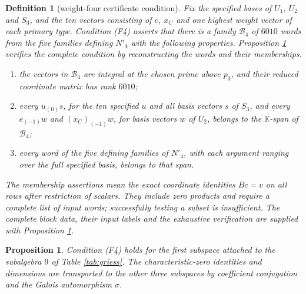 \documentclass[leqno]{article}
\newcommand{\K}{\ensuremath{\mathbb{K}}}
\newtheorem{defi}[thm]{Definition}
\newtheorem{prop}[thm]{Proposition}
\numberwithin{equation}{section}
\begin{document}
\begin{defi}[weight-four certificate condition]
\label{assump:weight-four}
Fix the specified bases of $U_1$, $U_2$ and $S_3$, and the ten vectors consisting of $e$, $x_C$ and one highest weight vector of each primary type. Condition \textup{(F4)} asserts that there is a family $\mathcal B_4$ of $6010$ words from the five families defining $N'_4$ with the following properties. Proposition \ref{prop:weight-four-certificate} verifies the complete condition by reconstructing the words and their memberships.
\begin{enumerate}
\item the vectors in $\mathcal B_4$ are integral at the chosen prime above $p_3$, and their reduced coordinate matrix has rank $6010$;
\item every $u_{(0)}s$, for the ten specified $u$ and all basis vectors $s$ of $S_3$, and every $e_{(-1)}w$ and $(x_C)_{(-1)}w$, for basis vectors $w$ of $U_2$, belongs to the $\K$-span of $\mathcal B_4$;
\item every word of the five defining families of $N'_4$, with each argument ranging over the full specified basis, belongs to that span.
\end{enumerate}
The membership assertions mean the exact coordinate identities $Bc = v$ on all rows after restriction of scalars. They include zero products and require a complete list of input words; successfully testing a subset is insufficient. The complete block data, their input labels and the exhaustive verification are supplied with Proposition \ref{prop:weight-four-certificate}.
\end{defi}

\begin{prop}
\label{prop:weight-four-certificate}
Condition \textup{(F4)} holds for the first subspace attached to the subalgebra $9$ of Table \ref{tab:griess}. The characteristic-zero identities and dimensions are transported to the other three subspaces by coefficient conjugation and the Galois automorphism $\sigma$.
\end{prop}
\end{document}
